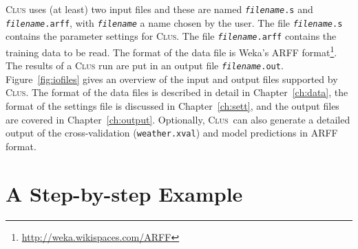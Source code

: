 \documentclass[a4paper]{report}
\newcommand{\clus}{\textsc{Clus}}
\begin{document}
\clus{} uses (at least) two input files and these are named {\tt {\em filename}.s} and {\tt {\em filename}.arff}, with {\tt {\em filename}} a name chosen by the user.  The file {\tt {\em filename}.s} contains the parameter settings for \clus{}. The file {\tt {\em filename}.arff} contains the training data to be read. The format of the data file is Weka's ARFF format\footnote{\url{http://weka.wikispaces.com/ARFF}}. The results of a \clus{} run are put in an output file {\tt {\em filename}.out}. Figure~\ref{fig:iofiles} gives an overview of the input and output files supported by \clus{}. The format of the data files is described in detail in Chapter~\ref{ch:data}, the format of the settings file is discussed in Chapter~\ref{ch:sett}, and the output files are covered in Chapter~\ref{ch:output}. Optionally, \clus\ can also generate a detailed output of the cross-validation (\texttt{weather.xval}) and model predictions in ARFF format.

%
\section{A Step-by-step Example}
\end{document}
